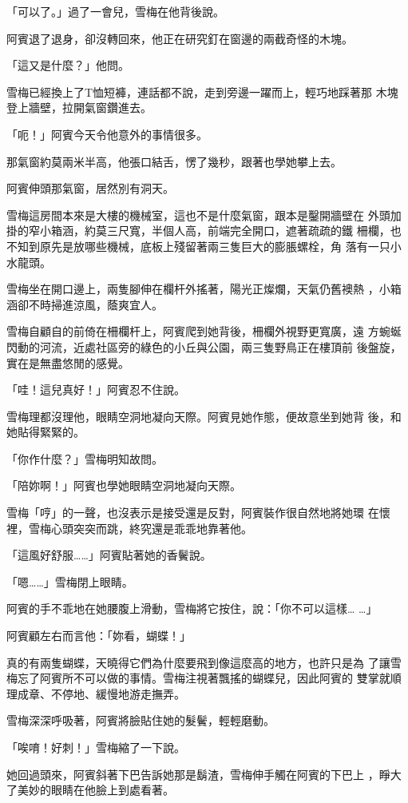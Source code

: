 「可以了。」過了一會兒，雪梅在他背後說。

阿賓退了退身，卻沒轉回來，他正在研究釘在窗邊的兩截奇怪的木塊。

「這又是什麼？」他問。

雪梅已經換上了T恤短褲，連話都不說，走到旁邊一躍而上，輕巧地踩著那
木塊登上牆壁，拉開氣窗鑽進去。

「呃！」阿賓今天令他意外的事情很多。

那氣窗約莫兩米半高，他張口結舌，愣了幾秒，跟著也學她攀上去。

阿賓伸頭那氣窗，居然別有洞天。

雪梅這房間本來是大樓的機械室，這也不是什麼氣窗，跟本是鑿開牆壁在
外頭加掛的窄小箱涵，約莫三尺寬，半個人高，前端完全開口，遮著疏疏的鐵
柵欄，也不知到原先是放哪些機械，底板上殘留著兩三隻巨大的膨脹螺栓，角
落有一只小水龍頭。

雪梅坐在開口邊上，兩隻腳伸在欄杆外搖著，陽光正燦爛，天氣仍舊襖熱
，小箱涵卻不時掃進涼風，蔭爽宜人。

雪梅自顧自的前倚在柵欄杆上，阿賓爬到她背後，柵欄外視野更寬廣，遠
方蜿蜒閃動的河流，近處社區旁的綠色的小丘與公園，兩三隻野鳥正在樓頂前
後盤旋，實在是無盡悠閒的感覺。

「哇！這兒真好！」阿賓忍不住說。

雪梅理都沒理他，眼睛空洞地凝向天際。阿賓見她作態，便故意坐到她背
後，和她貼得緊緊的。

「你作什麼？」雪梅明知故問。

「陪妳啊！」阿賓也學她眼睛空洞地凝向天際。

雪梅「哼」的一聲，也沒表示是接受還是反對，阿賓裝作很自然地將她環
在懷裡，雪梅心頭突突而跳，終究還是乖乖地靠著他。

「這風好舒服……」阿賓貼著她的香鬢說。

「嗯……」雪梅閉上眼睛。

阿賓的手不乖地在她腰腹上滑動，雪梅將它按住，說：「你不可以這樣…
…」

阿賓顧左右而言他：「妳看，蝴蝶！」

真的有兩隻蝴蝶，天曉得它們為什麼要飛到像這麼高的地方，也許只是為
了讓雪梅忘了阿賓所不可以做的事情。雪梅注視著飄搖的蝴蝶兒，因此阿賓的
雙掌就順理成章、不停地、緩慢地游走撫弄。

雪梅深深呼吸著，阿賓將臉貼住她的髮鬢，輕輕磨動。

「唉唷！好刺！」雪梅縮了一下說。

她回過頭來，阿賓斜著下巴告訴她那是鬍渣，雪梅伸手觸在阿賓的下巴上
，睜大了美妙的眼睛在他臉上到處看著。

